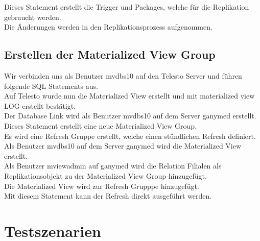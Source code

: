 \documentclass[11pt,a4paper,parskip=half]{scrartcl}
\begin{document}

Dieses Statement erstellt die Trigger und Packages, welche für die Replikation gebraucht werden.\\


Die Änderungen werden in den Replikationsprozess aufgenommen.\\

\subsection{Erstellen der Materialized View Group}
Wir verbinden uns als Benutzer mvdbs10 auf den Telesto Server und führen folgende SQL Statements aus.\\


Auf Telesto wurde nun die Materialized View erstellt und mit \glqq{}materialized view LOG erstellt\grqq{} bestätigt.\\


Der Database Link wird als Benutzer mvdbs10 auf dem Server ganymed erstellt.\\


Dieses Statement erstellt eine neue Materialized View Group.\\


Es wird eine Refresh Gruppe erstellt, welche einen stündlichen Refresh definiert.\\


Als Benutzer mvdbs10 auf dem Server ganymed wird die Materialized View erstellt.\\


Als Benutzer mviewadmin auf ganymed wird die Relation Filialen als Replikationsobjekt zu der Materialized View Group hinzugefügt.\\


Die Materialized View wird zur Refresh Grupppe hinzugefügt.\\


Mit diesem Statement kann der Refresh direkt ausgeführt werden.\\

\section{Testszenarien}
\end{document}
